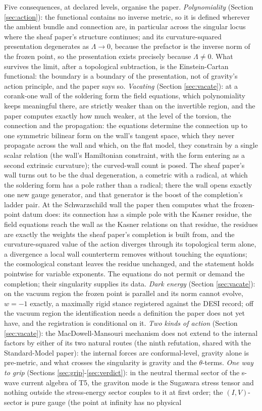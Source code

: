 \documentclass[11pt]{article}
\theoremstyle{definition}
\begin{document}
Five consequences, at declared levels, organise the paper. \emph{Polynomiality} (Section \ref{sec:action}): the functional contains no inverse metric, so it is defined wherever the ambient bundle and connection are, in particular across the singular locus where the sheaf paper's structure continues; and its curvature-squared presentation degenerates as $\Lambda \to 0$, because the prefactor is the inverse norm of the frozen point, so the presentation exists precisely because $\Lambda \neq 0$. What survives the limit, after a topological subtraction, is the Einstein-Cartan functional: the boundary is a boundary of the presentation, not of gravity's action principle, and the paper says so. \emph{Vacating} (Section \ref{sec:vacate}): at a corank-one wall of the soldering form the field equations, which polynomiality keeps meaningful there, are strictly weaker than on the invertible region, and the paper computes exactly how much weaker, at the level of the torsion, the connection and the propagation: the equations determine the connection up to one symmetric bilinear form on the wall's tangent space, which they never propagate across the wall and which, on the flat model, they constrain by a single scalar relation (the wall's Hamiltonian constraint, with the form entering as a second extrinsic curvature); the curved-wall count is posed. The sheaf paper's wall turns out to be the dual degeneration, a cometric with a radical, at which the soldering form has a pole rather than a radical; there the wall opens exactly one new gauge generator, and that generator is the boost of the completion's ladder pair. At the Schwarzschild wall the paper then computes what the frozen-point datum does: its connection has a simple pole with the Kasner residue, the field equations reach the wall as the Kasner relations on that residue, the residues are exactly the weights the sheaf paper's completion is built from, and the curvature-squared value of the action diverges through its topological term alone, a divergence a local wall counterterm removes without touching the equations; the cosmological constant leaves the residue unchanged, and the statement holds pointwise for variable exponents. The equations do not permit or demand the completion; their singularity supplies its data. \emph{Dark energy} (Section \ref{sec:vacate}): on the vacuum region the frozen point is parallel and its norm cannot evolve, $w = -1$ exactly, a maximally rigid stance registered against the DESI record; off the vacuum region the identification needs a definition the paper does not yet have, and the registration is conditional on it. \emph{Two kinds of action} (Section \ref{sec:vacate}): the MacDowell-Mansouri mechanism does not extend to the internal factors by either of its two natural routes (the ninth refutation, shared with the Standard-Model paper): the internal forces are conformal-level, gravity alone is pre-metric, and what crosses the singularity is gravity and the $\theta$-terms. \emph{One way to grip} (Sections \ref{sec:grip}-\ref{sec:verdict}): in the neutral thermal sector of the s-wave current algebra of T5, the graviton mode is the Sugawara stress tensor and nothing outside the stress-energy sector couples to it at first order; the $(I,V)$-sector is pure gauge (the point at infinity has no physical 
\end{document}
